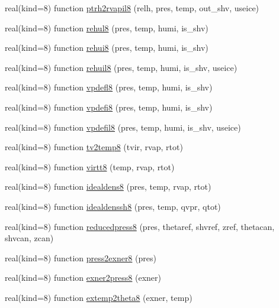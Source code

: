 \begin{DoxyCompactItemize}
real(kind=8) function \hyperlink{namespacetherm__lib8_a8ad59ba9abc05562f0c90d7ef6a8bca8}{ptrh2rvapil8} (relh, pres, temp, out\+\_\+shv, useice)
\item 
real(kind=8) function \hyperlink{namespacetherm__lib8_a00df68c843939c4d08f0e8ef99ad4fba}{rehul8} (pres, temp, humi, is\+\_\+shv)
\item 
real(kind=8) function \hyperlink{namespacetherm__lib8_aab9071671edac02a14988c3f5724aa51}{rehui8} (pres, temp, humi, is\+\_\+shv)
\item 
real(kind=8) function \hyperlink{namespacetherm__lib8_a51fbba130b3fc3a6cc1744aeb76a2b81}{rehuil8} (pres, temp, humi, is\+\_\+shv, useice)
\item 
real(kind=8) function \hyperlink{namespacetherm__lib8_ab166c98ec9b055545b3545d1816fd9bc}{vpdefl8} (pres, temp, humi, is\+\_\+shv)
\item 
real(kind=8) function \hyperlink{namespacetherm__lib8_a1f7ea92fca9ac1740028a6781997e12f}{vpdefi8} (pres, temp, humi, is\+\_\+shv)
\item 
real(kind=8) function \hyperlink{namespacetherm__lib8_a11c93be5459d6b6a5501cbd52977e6ab}{vpdefil8} (pres, temp, humi, is\+\_\+shv, useice)
\item 
real(kind=8) function \hyperlink{namespacetherm__lib8_ae028e7a977aa12e130948694af49c31d}{tv2temp8} (tvir, rvap, rtot)
\item 
real(kind=8) function \hyperlink{namespacetherm__lib8_a84cb0b0932922178e82afb8a5f9627ad}{virtt8} (temp, rvap, rtot)
\item 
real(kind=8) function \hyperlink{namespacetherm__lib8_a18ba1889218ff1cf51e4b8ec9c612f02}{idealdens8} (pres, temp, rvap, rtot)
\item 
real(kind=8) function \hyperlink{namespacetherm__lib8_a71a3a8a71ff6e3d11c6b604f495e5240}{idealdenssh8} (pres, temp, qvpr, qtot)
\item 
real(kind=8) function \hyperlink{namespacetherm__lib8_ad325dbfaa9ff36bd492b23150ffd2dc0}{reducedpress8} (pres, thetaref, shvref, zref, thetacan, shvcan, zcan)
\item 
real(kind=8) function \hyperlink{namespacetherm__lib8_affcedde7d4e3f1d858091ea47c58186f}{press2exner8} (pres)
\item 
real(kind=8) function \hyperlink{namespacetherm__lib8_a790e9ad68221393de29c2383a301da8e}{exner2press8} (exner)
\item 
real(kind=8) function \hyperlink{namespacetherm__lib8_a309e38d181bfb3eea47d3f220e44b923}{extemp2theta8} (exner, temp)
\item 

\end{DoxyCompactItemize}
